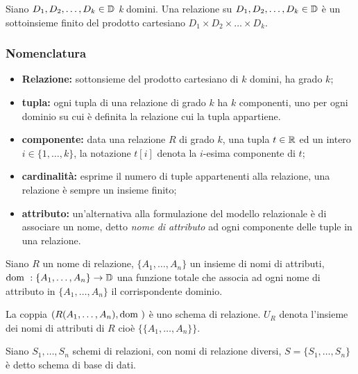 \begin{definizione}[Relazione]
Siano $D_1,D_2,\dots,D_k\in\mathbb{D}$ \emph{k} domini.
Una relazione su $D_1,D_2,\dots,D_k\in\mathbb{D}$ è un sottoinsieme finito del prodotto
cartesiano $D_1\times D_2\times\dots\times D_k$.
\end{definizione}

\subsubsection{Nomenclatura}%
\label{ssub:Nomenclatura}
\begin{itemize}
  \item \textbf{Relazione:} sottonsieme del prodotto cartesiano di $k$ domini,
    ha grado $k$;
  \item \textbf{tupla:} ogni tupla di una relazione di grado $k$ ha $k$
    componenti, uno per ogni dominio su cui è definita la relazione cui la tupla
    appartiene.
  \item \textbf{componente:} data una relazione $R$ di grado $k$, una tupla
    $t\in\mathbb{R}$ ed un intero $i\in\{1,\dots,k\}$, la notazione $t[i]$ denota la
    $i$-esima componente di $t$;
  \item \textbf{cardinalità:} esprime il numero di tuple appartenenti alla
    relazione, una relazione è sempre un insieme finito;
  \item \textbf{attributo:} un'alternativa alla formulazione del modello
    relazionale è di associare un nome, detto \emph{nome di attributo} ad ogni
    componente delle tuple in una relazione.
\end{itemize}

\begin{definizione}
  Siano $R$ un nome di relazione, $\{A_1,\dots,A_n\}$ un insieme di nomi di
  attributi, $\text{dom }:\{A_1,\dots,A_n\}\rightarrow\mathbb{D}$ una funzione totale che
  associa ad ogni nome di attributo in $\{A_1,\dots,A_n\}$ il corrispondente
  dominio.

  La coppia $(R(A_1,\dots,A_n),\text{dom })$ è uno schema di relazione.
  $U_R$ denota l'insieme dei nomi di attributi di $R$ cioè
  $\{\{A_1,\dots,A_n\}\}$.
\end{definizione}

\begin{definizione}
Siano $S_1,\dots,S_n$ schemi di relazioni, con nomi di relazione diversi,
$S=\{S_1,\dots,S_n\}$ è detto schema di base di dati.
\end{definizione}

